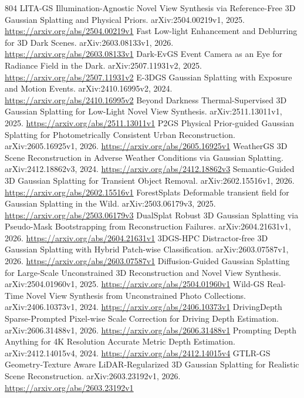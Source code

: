 \documentclass[11pt]{article}
\begin{document}
\begin{thebibliography}{804}
 LITA-GS Illumination-Agnostic Novel View Synthesis via Reference-Free 3D Gaussian Splatting and Physical Priors. arXiv:2504.00219v1, 2025. \url{https://arxiv.org/abs/2504.00219v1}
 Fast Low-light Enhancement and Deblurring for 3D Dark Scenes. arXiv:2603.08133v1, 2026. \url{https://arxiv.org/abs/2603.08133v1}
 Dark-EvGS Event Camera as an Eye for Radiance Field in the Dark. arXiv:2507.11931v2, 2025. \url{https://arxiv.org/abs/2507.11931v2}
 E-3DGS Gaussian Splatting with Exposure and Motion Events. arXiv:2410.16995v2, 2024. \url{https://arxiv.org/abs/2410.16995v2}
 Beyond Darkness Thermal-Supervised 3D Gaussian Splatting for Low-Light Novel View Synthesis. arXiv:2511.13011v1, 2025. \url{https://arxiv.org/abs/2511.13011v1}
 P2GS Physical Prior-guided Gaussian Splatting for Photometrically Consistent Urban Reconstruction. arXiv:2605.16925v1, 2026. \url{https://arxiv.org/abs/2605.16925v1}
 WeatherGS 3D Scene Reconstruction in Adverse Weather Conditions via Gaussian Splatting. arXiv:2412.18862v3, 2024. \url{https://arxiv.org/abs/2412.18862v3}
 Semantic-Guided 3D Gaussian Splatting for Transient Object Removal. arXiv:2602.15516v1, 2026. \url{https://arxiv.org/abs/2602.15516v1}
 ForestSplats Deformable transient field for Gaussian Splatting in the Wild. arXiv:2503.06179v3, 2025. \url{https://arxiv.org/abs/2503.06179v3}
 DualSplat Robust 3D Gaussian Splatting via Pseudo-Mask Bootstrapping from Reconstruction Failures. arXiv:2604.21631v1, 2026. \url{https://arxiv.org/abs/2604.21631v1}
 3DGS-HPC Distractor-free 3D Gaussian Splatting with Hybrid Patch-wise Classification. arXiv:2603.07587v1, 2026. \url{https://arxiv.org/abs/2603.07587v1}
 Diffusion-Guided Gaussian Splatting for Large-Scale Unconstrained 3D Reconstruction and Novel View Synthesis. arXiv:2504.01960v1, 2025. \url{https://arxiv.org/abs/2504.01960v1}
 Wild-GS Real-Time Novel View Synthesis from Unconstrained Photo Collections. arXiv:2406.10373v1, 2024. \url{https://arxiv.org/abs/2406.10373v1}
 DrivingDepth Sparse-Prompted Pixel-wise Scale Correction for Driving Depth Estimation. arXiv:2606.31488v1, 2026. \url{https://arxiv.org/abs/2606.31488v1}
 Prompting Depth Anything for 4K Resolution Accurate Metric Depth Estimation. arXiv:2412.14015v4, 2024. \url{https://arxiv.org/abs/2412.14015v4}
 GTLR-GS Geometry-Texture Aware LiDAR-Regularized 3D Gaussian Splatting for Realistic Scene Reconstruction. arXiv:2603.23192v1, 2026. \url{https://arxiv.org/abs/2603.23192v1}

\end{thebibliography}
\end{document}

